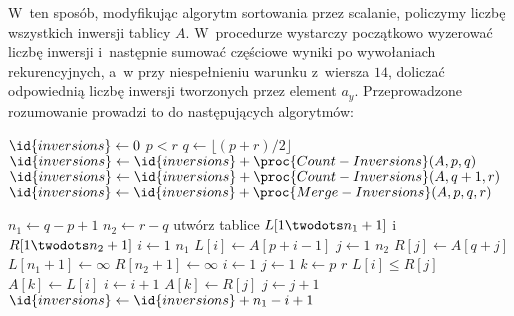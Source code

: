 W~ten sposób, modyfikując algorytm sortowania przez scalanie, policzymy liczbę wszystkich inwersji tablicy $A$. W~procedurze  wystarczy początkowo wyzerować liczbę inwersji i~następnie sumować częściowe wyniki po wywołaniach rekurencyjnych, a~w  przy niespełnieniu warunku z~wiersza $14$, doliczać odpowiednią liczbę inwersji tworzonych przez element $a_y$. Przeprowadzone rozumowanie prowadzi to do następujących algorytmów:

\begin{codebox}
\li	$\id{inversions}\gets 0$
\li	\If $p<r$
\li		\Then
			$q\gets\lfloor(p+r)/2\rfloor$
\li			$\id{inversions}\gets\id{inversions}+\proc{Count-Inversions}(A,p,q)$
\li			$\id{inversions}\gets\id{inversions}+\proc{Count-Inversions}(A,q+1,r)$
\li			$\id{inversions}\gets\id{inversions}+\proc{Merge-Inversions}(A,p,q,r)$
		\End
\li	\Return {}
\end{codebox}

\begin{codebox}
\li	$n_1\gets q-p+1$
\li	$n_2\gets r-q$
\li	utwórz tablice $L[1\twodots n_1+1]$ i~$R[1\twodots n_2+1]$
\li	\For $i\gets 1$ \To $n_1$
\li		\Do
			$L[i]\gets A[p+i-1]$
		\End
\li	\For $j\gets 1$ \To $n_2$
\li		\Do
			$R[j]\gets A[q+j]$
		\End
\li	$L[n_1+1]\gets\infty$
\li	$R[n_2+1]\gets\infty$
\li	$i\gets 1$
\li	$j\gets 1$
\li	\For $k\gets p$ \To $r$
\li		\Do
\li			\If $L[i]\le R[j]$
\li				\Then
					$A[k]\gets L[i]$
\li					$i\gets i+1$
\li				\Else
					$A[k]\gets R[j]$
\li					$j\gets j+1$
\li					$\id{inversions}\gets\id{inversions}+n_1-i+1$
				\End
		\End
\li	\Return {}
\end{codebox}
